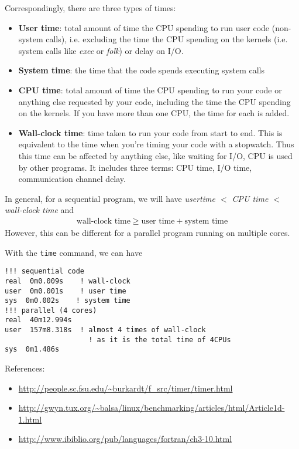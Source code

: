 Correspondingly, there are three types of times:
\begin{itemize}
\item {\bf User time}: total amount of time the CPU spending to run
  user code (non-system calls), i.e. excluding the time the CPU
  spending on the kernels (i.e. system calls like {\it exec} or
  {\it folk}) or delay on I/O.
\item {\bf System time}: the time that the code spends executing
  system calls
\item {\bf CPU time}: total amount of time the CPU spending to run your code
  or anything else requested by your code, including the time the CPU
  spending on the kernels. If you have more than one CPU, the time for
  each is added. 
\item {\bf Wall-clock time}: time taken to run your code from start to
  end. This is equivalent to the time when you're timing your code
  with a stopwatch. Thus this time can be affected by anything else,
  like waiting for I/O, CPU is used by other programs. It includes
  three terms: CPU time, I/O time, communication channel delay.
\end{itemize}
In general, for a sequential program, we will have
{\it usertime $<$ CPU time $<$ wall-clock time} and
\begin{eqnarray*}
  \text{wall-clock time} \ge \text{user time} + \text{system time}
\end{eqnarray*}
However, this can be different for a parallel program running on
multiple cores.

With the \verb.time. command, we can have
\begin{verbatim}
!!! sequential code
real  0m0.009s    ! wall-clock
user  0m0.001s    ! user time
sys  0m0.002s    ! system time
!!! parallel (4 cores)
real  40m12.994s 
user  157m8.318s  ! almost 4 times of wall-clock
                    ! as it is the total time of 4CPUs
sys  0m1.486s
\end{verbatim}

References:
\begin{itemize}
\item \url{http://people.sc.fsu.edu/~burkardt/f_src/timer/timer.html}
\item
  \url{http://gwyn.tux.org/~balsa/linux/benchmarking/articles/html/Article1d-1.html}
\item \url{http://www.ibiblio.org/pub/languages/fortran/ch3-10.html}
\end{itemize}

